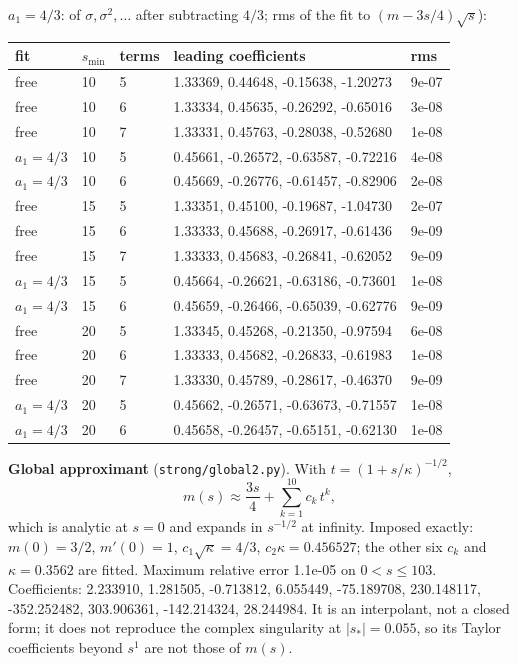 $a_1=4/3$: of $\sigma,\sigma^2,\dots$ after subtracting $4/3$; rms of the fit to $(m-3s/4)\sqrt s$):
\begin{center}\small\begin{tabular}{lllll}\toprule fit & $s_{\min}$ & terms & leading coefficients & rms\\\midrule
free & 10 & 5 & 1.33369, 0.44648, -0.15638, -1.20273 & 9e-07\\
free & 10 & 6 & 1.33334, 0.45635, -0.26292, -0.65016 & 3e-08\\
free & 10 & 7 & 1.33331, 0.45763, -0.28038, -0.52680 & 1e-08\\
$a_1=4/3$ & 10 & 5 & 0.45661, -0.26572, -0.63587, -0.72216 & 4e-08\\
$a_1=4/3$ & 10 & 6 & 0.45669, -0.26776, -0.61457, -0.82906 & 2e-08\\
free & 15 & 5 & 1.33351, 0.45100, -0.19687, -1.04730 & 2e-07\\
free & 15 & 6 & 1.33333, 0.45688, -0.26917, -0.61436 & 9e-09\\
free & 15 & 7 & 1.33333, 0.45683, -0.26841, -0.62052 & 9e-09\\
$a_1=4/3$ & 15 & 5 & 0.45664, -0.26621, -0.63186, -0.73601 & 1e-08\\
$a_1=4/3$ & 15 & 6 & 0.45659, -0.26466, -0.65039, -0.62776 & 9e-09\\
free & 20 & 5 & 1.33345, 0.45268, -0.21350, -0.97594 & 6e-08\\
free & 20 & 6 & 1.33333, 0.45682, -0.26833, -0.61983 & 1e-08\\
free & 20 & 7 & 1.33330, 0.45789, -0.28617, -0.46370 & 9e-09\\
$a_1=4/3$ & 20 & 5 & 0.45662, -0.26571, -0.63673, -0.71557 & 1e-08\\
$a_1=4/3$ & 20 & 6 & 0.45658, -0.26457, -0.65151, -0.62130 & 1e-08\\
\bottomrule\end{tabular}\end{center}
\textbf{Global approximant} (\texttt{strong/global2.py}). With $t=(1+s/\kappa)^{-1/2}$,
\[ m(s)\approx\frac{3s}{4}+\sum_{k=1}^{10}c_k\,t^k , \]
which is analytic at $s=0$ and expands in $s^{-1/2}$ at infinity. Imposed exactly: $m(0)=3/2$,
$m'(0)=1$, $c_1\sqrt\kappa=4/3$, $c_2\kappa=0.456527$; the other six $c_k$ and
$\kappa=0.3562$ are fitted. Maximum relative error 1.1e-05 on
$0<s\le103$. Coefficients: 2.233910, 1.281505, -0.713812, 6.055449, -75.189708, 230.148117, -352.252482, 303.906361, -142.214324, 28.244984.
It is an interpolant, not a closed form; it does not reproduce the complex singularity at
$|s_*|=0.055$, so its Taylor coefficients beyond $s^1$ are not those of $m(s)$.

